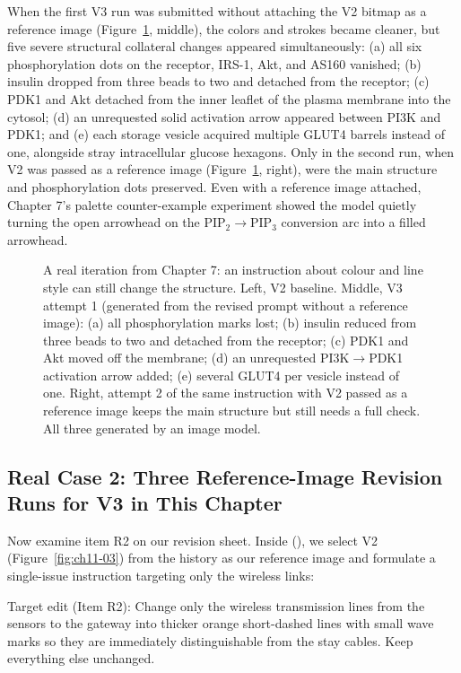 When the first V3 run was submitted without attaching the V2 bitmap as a reference image (Figure~\ref{fig:ch11-07}, middle), the colors and strokes became cleaner, but five severe structural collateral changes appeared simultaneously: (a) all six phosphorylation dots on the receptor, IRS-1, Akt, and AS160 vanished; (b) insulin dropped from three beads to two and detached from the receptor; (c) PDK1 and Akt detached from the inner leaflet of the plasma membrane into the cytosol; (d) an unrequested solid activation arrow appeared between PI3K and PDK1; and (e) each storage vesicle acquired multiple GLUT4 barrels instead of one, alongside stray intracellular glucose hexagons. Only in the second run, when V2 was passed as a reference image (Figure~\ref{fig:ch11-07}, right), were the main structure and phosphorylation dots preserved. Even with a reference image attached, Chapter 7's palette counter-example experiment showed the model quietly turning the open arrowhead on the $\text{PIP}_2 \rightarrow \text{PIP}_3$ conversion arc into a filled arrowhead.

\begin{figure}[htbp]\centering

\caption{A real iteration from Chapter 7: an instruction about colour and line style can still change the structure. Left, V2 baseline. Middle, V3 attempt 1 (generated from the revised prompt without a reference image): (a) all phosphorylation marks lost; (b) insulin reduced from three beads to two and detached from the receptor; (c) PDK1 and Akt moved off the membrane; (d) an unrequested PI3K$\rightarrow$PDK1 activation arrow added; (e) several GLUT4 per vesicle instead of one. Right, attempt 2 of the same instruction with V2 passed as a reference image keeps the main structure but still needs a full check. All three generated by an image model.}\label{fig:ch11-07}
\end{figure}

\subsection{Real Case 2: Three Reference-Image Revision Runs for V3 in This Chapter}

Now examine item R2 on our revision sheet. Inside \scidraw{} (), we select V2 (Figure~\ref{fig:ch11-03}) from the history as our reference image and formulate a single-issue instruction targeting only the wireless links:

\begin{Prompt}
Target edit (Item R2): Change only the wireless transmission lines from the sensors
to the gateway into thicker orange short-dashed lines with small wave marks so they
are immediately distinguishable from the stay cables. Keep everything else unchanged.
\end{Prompt}


